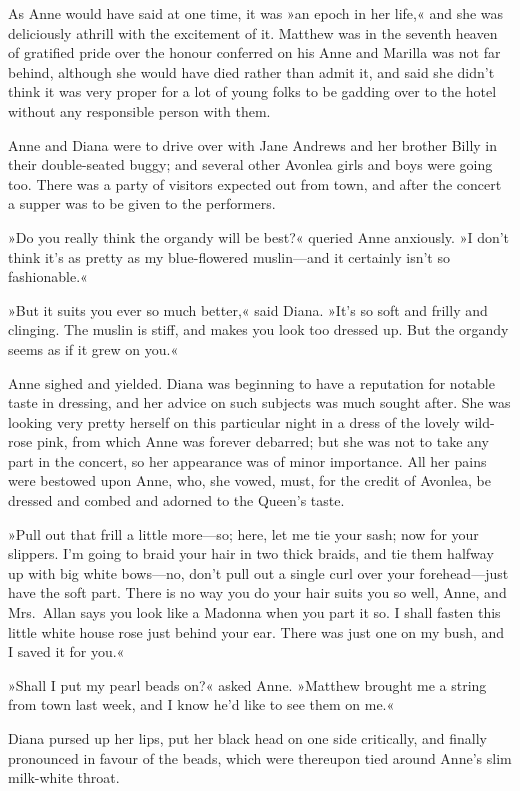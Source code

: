 As Anne would have said at one time, it was »an epoch in her life,« and she was deliciously athrill with the excitement of it. Matthew was in the seventh heaven of gratified pride over the honour conferred on his Anne and Marilla was not far behind, although she would have died rather than admit it, and said she didn't think it was very proper for a lot of young folks to be gadding over to the hotel without any responsible person with them.

Anne and Diana were to drive over with Jane Andrews and her brother Billy in their double-seated buggy; and several other Avonlea girls and boys were going too. There was a party of visitors expected out from town, and after the concert a supper was to be given to the performers.

»Do you really think the organdy will be best?« queried Anne anxiously. »I don't think it's as pretty as my blue-flowered muslin—and it certainly isn't so fashionable.«

»But it suits you ever so much better,« said Diana. »It's so soft and frilly and clinging. The muslin is stiff, and makes you look too dressed up. But the organdy seems as if it grew on you.«

Anne sighed and yielded. Diana was beginning to have a reputation for notable taste in dressing, and her advice on such subjects was much sought after. She was looking very pretty herself on this particular night in a dress of the lovely wild-rose pink, from which Anne was forever debarred; but she was not to take any part in the concert, so her appearance was of minor importance. All her pains were bestowed upon Anne, who, she vowed, must, for the credit of Avonlea, be dressed and combed and adorned to the Queen's taste.

»Pull out that frill a little more—so; here, let me tie your sash; now for your slippers. I'm going to braid your hair in two thick braids, and tie them halfway up with big white bows—no, don't pull out a single curl over your forehead—just have the soft part. There is no way you do your hair suits you so well, Anne, and Mrs.~Allan says you look like a Madonna when you part it so. I shall fasten this little white house rose just behind your ear. There was just one on my bush, and I saved it for you.«

»Shall I put my pearl beads on?« asked Anne. »Matthew brought me a string from town last week, and I know he'd like to see them on me.«

Diana pursed up her lips, put her black head on one side critically, and finally pronounced in favour of the beads, which were thereupon tied around Anne's slim milk-white throat.

